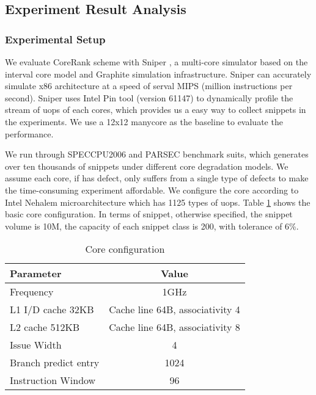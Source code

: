 \subsection{Experiment Result Analysis} \label{sec:3}
\subsubsection{Experimental Setup}
We evaluate CoreRank scheme with Sniper \cite{sniper}, a multi-core simulator based on the interval core model\cite{IntervalSimulation} and Graphite\cite{Graphite} simulation infrastructure. Sniper can accurately simulate x86 architecture at a speed of serval MIPS (million instructions per second). Sniper uses Intel Pin tool (version 61147) to dynamically profile the stream of uops of each cores, which provides us a easy way to collect snippets in the experiments.   We use a 12x12 manycore as the baseline to evaluate the performance.

We run through SPECCPU2006 and PARSEC benchmark suits, which generates over ten thousands of snippets under different core degradation models. We assume each core, if has defect,  only suffers from a single type of defects to make the time-consuming experiment affordable.   We configure the core  according to Intel Nehalem microarchitecture which has 1125 types of uops.  Table \ref{Exp} shows the basic core configuration.   In terms of snippet, otherwise specified, the snippet volume is 10M, the capacity of each snippet class is 200, with tolerance of 6\%.


\begin{table}
\caption{Core configuration}\label{Exp}
\begin{center}\small
    \begin{tabular}{|l|c|}
  \hline
  \textbf{Parameter} &\textbf{ Value} \\
  \hline
  \hline
  Frequency & 1GHz \\
  \hline
  L1 I/D cache 32KB &  Cache line 64B, associativity 4 \\
 \hline
  L2 cache  512KB &  Cache line 64B, associativity 8 \\
  \hline
  Issue Width &  4 \\
  \hline
  Branch predict entry  &  1024\\
  \hline
  Instruction Window &  96 \\
  \hline
  \end{tabular}
  
  \end{center}
\end{table}

